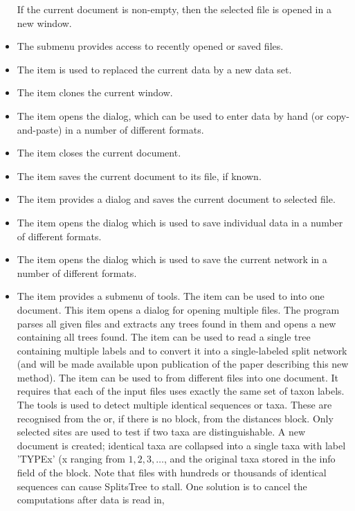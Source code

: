 \documentclass[11pt]{article}
\begin{document}
\begin{itemize}
If the current document is non-empty, then the selected file
is opened in a new  window.
\item
The  submenu provides access to recently
opened or saved files.
\item
The  item is used to replaced the current
data by a new data set.
\item
The  item clones the current window.
\item
The  item opens the  dialog, which can be used to enter data by hand (or copy-and-paste)
in a number of different formats.
\item
The  item closes the current document.
\item
The  item saves the current document to its file, if known.
\item
The  item provides a  dialog
and saves the current document to selected file.
\item
The  item opens the  dialog
which is used to save individual data in a number of different
formats.
\item
The  item opens the  dialog
which is used to save the current network in a number of different
formats.
\item The  item provides a submenu of tools.
The  item can be used to
into one document. This item opens a dialog for opening
multiple files. The program parses all given files and extracts any trees found
in them and opens a new  containing all trees found.
The  item can be used to
read a single tree containing multiple labels and to convert it into
a single-labeled split network (and will be made available upon publication of
the paper describing this new method).
The  item can be used to
 from different files
into one document. It requires that each of the input files uses exactly the
same set of taxon labels.
The  tools is used to detect multiple identical sequences or taxa. These are recognised from  the  or, if there is no  block, from the distances block. Only selected sites are used to test if two taxa are distinguishable. A new document is created; identical taxa are collapsed into a single taxa with label 'TYPEx'  (x ranging from $1,2,3,\ldots$, and the original taxa stored in the info field of the  block. Note that files with hundreds or thousands of identical sequences can cause SplitsTree to stall. One solution is to cancel the computations after data is read in,

\end{itemize}
\end{document}
